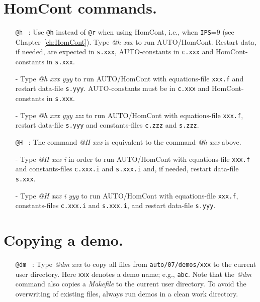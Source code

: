 \documentclass[12pt]{report}
\begin{document}
\section{ HomCont commands.} 

\begin{itemize}
\item[\tt @h]~:
  Use {\tt @h} instead of {\tt @r} when using {\cal HomCont}, i.e., when {\tt IPS}=9
  (see Chapter~\ref{ch:HomCont}).
  Type {\it @h xxx} to run {\cal AUTO}/{\cal HomCont}.
  Restart data, if needed, are expected in {\tt s.xxx},
  {\cal AUTO}-constants in {\tt c.xxx} and {\cal HomCont}-constants in {\tt s.xxx}.
\item[-]
  Type {\it @h xxx yyy} to run {\cal AUTO}/{\cal HomCont}
  with equations-file {\tt xxx.f} and restart data-file {\tt s.yyy}.
  {\cal AUTO}-constants must be in {\tt c.xxx} and {\cal HomCont}-constants in {\tt s.xxx}.
\item[-]
  Type {\it @h xxx yyy zzz} to run {\cal AUTO}/{\cal HomCont}
  with equations-file {\tt xxx.f}, restart data-file {\tt s.yyy}
  and constants-files {\tt c.zzz} and {\tt s.zzz}.

\item[\tt @H]~:
  The command {\it @H xxx} is equivalent to the command {\it @h xxx} above.
\item[-]
  Type {\it @H xxx i} in order to run {\cal AUTO}/{\cal HomCont} with equations-file {\tt xxx.f}
  and constants-files {\tt c.xxx.i} and {\tt s.xxx.i}
  and, if needed, restart data-file {\tt s.xxx}. 
\item[-]
  Type {\it @H xxx i yyy} to run {\cal AUTO}/{\cal HomCont}
  with equations-file {\tt xxx.f}, 
  constants-files {\tt c.xxx.i} and {\tt s.xxx.i},
  and restart data-file {\tt s.yyy}.
\end{itemize}

\section{ Copying a demo.} 

\begin{itemize}

\item[\tt @dm]~:
  Type {\it @dm xxx} 
  to copy all files 
  from {\tt auto/07/demos/xxx}
  to the current user directory.
  Here {\tt xxx} denotes a demo name; e.g., {\tt abc}.
  Note that the {\it @dm} command also copies a {\it Makefile}
  to the current user directory. To avoid the overwriting of
  existing files, always run demos in a clean work directory.
\end{itemize}
\end{document}
